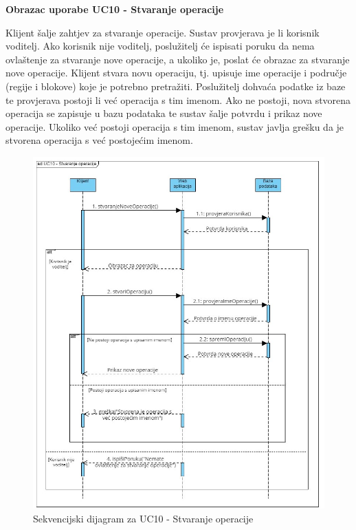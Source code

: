                 \eject

                \textbf{Obrazac uporabe UC10 - Stvaranje operacije}

                Klijent šalje zahtjev za stvaranje operacije. Sustav provjerava je li korisnik voditelj. Ako korisnik nije voditelj, poslužitelj će ispisati poruku da nema ovlaštenje za stvaranje nove operacije, a ukoliko je, poslat će obrazac za stvaranje nove operacije. Klijent stvara novu operaciju, tj. upisuje ime operacije i područje (regije i blokove) koje je potrebno pretražiti. Poslužitelj dohvaća podatke iz baze te provjerava postoji li već operacija s tim imenom. Ako ne postoji, nova stvorena operacija se zapisuje u bazu podataka te sustav šalje potvrdu i prikaz nove operacije. Ukoliko  već postoji operacija s tim imenom, sustav javlja grešku da je stvorena operacija s već postojećim imenom.
                
                \begin{figure}[H] \includegraphics[width=\linewidth]{./dijagrami/StvaranjeOperacije.jpg}
				    \caption{Sekvencijski dijagram za UC10 - Stvaranje operacije}
				    \end{figure}

